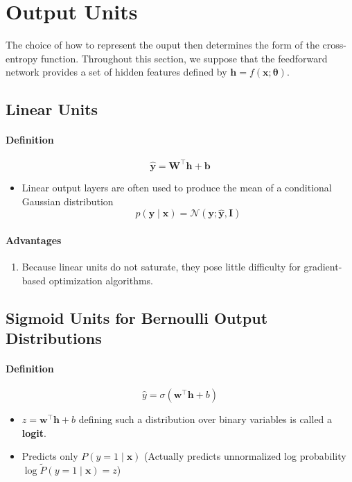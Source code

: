 \documentclass[12pt, a4paper]{article}
\def\vb{\boldsymbol{b}}
\def\vh{\boldsymbol{h}}
\def\vw{\boldsymbol{w}}
\def\vx{\boldsymbol{x}}
\def\vy{\boldsymbol{y}}
\def\vI{\boldsymbol{I}}
\def\vW{\boldsymbol{W}}
\def\vtheta{\boldsymbol{\theta}}
\newcommand{\ND}[3]{\mathcal{N}(#1;#2,#3)}
\begin{document}
\section{Output Units}
The choice of how to represent the ouput then determines the form of the cross-entropy function.
\newline
Throughout this section, we suppose that the feedforward network provides a set of hidden features defined by $\vh = f(\vx;\vtheta)$.
\subsection{Linear Units}
\paragraph{Definition}
\[
    \hat{\vy} = \vW^\top\vh+\vb
\]
\begin{itemize}
    \item Linear output layers are often used to produce the mean of a conditional Gaussian distribution
        \[
            p(\vy \mid \vx) = \ND{\vy}{\hat{\vy}}{\vI}
        \]
\end{itemize}
\paragraph{Advantages}
\begin{enumerate}
    \item Because linear units do not saturate, they pose little difficulty for gradient-based optimization algorithms.
\end{enumerate}
\subsection{Sigmoid Units for Bernoulli Output Distributions}
\paragraph{Definition}
\[
    \hat{y} = \sigma \left( \vw^\top \vh + b \right)
\]
\begin{itemize}
    \item $z = \vw^\top \vh + b$ defining such a distribution over binary variables is called a \textbf{logit}.
    \item Predicts only $P(y=1 \mid \vx)$ 
        \newline
        (Actually predicts unnormalized log probability $\log \tilde{P}(y=1 \mid \vx) = z$)
\end{itemize}
\end{document}
